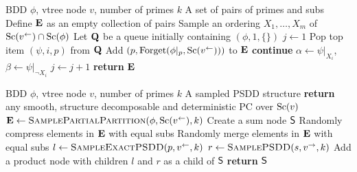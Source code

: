 \begin{algorithm}[t]
  \caption{}\label{alg:samplepartial}
  \begin{algorithmic}[1]
    \Require BDD $\phi$, vtree node $v$, number of primes $k$
    \Ensure A set of pairs of primes and subs
    \State Define $\mathbf{E}$ as an empty collection of pairs
    \State Sample an ordering $X_1,\ldots,X_m$ of $\operatorname*{\normalfont{Sc}}(v^\gets)\cap\operatorname*{\normalfont{Sc}}(\phi)$
    \State Let $\mathbf{Q}$ be a queue initially containing $(\phi,1,\{\})$
    \State $j\gets 1$
    \label{alg:samplepartial:line:while}
      \State Pop top item $(\psi,i,p)$ from $\mathbf{Q}$
        \State Add $(p,\operatorname{\normalfont{Forget}}(\phi|_p,\operatorname*{\normalfont{Sc}}(v^\gets)))$ to $\mathbf{E}$
        \State \textbf{continue}
      \EndIf
      \State $\alpha\gets\psi|_{X_i}$, $\beta\gets\psi|_{\neg X_i}$
      \NIElse
        \State $j\gets j+1$
      \EndNIElse
    \EndWhile
    \State \textbf{return} $\mathbf{E}$
  \end{algorithmic}
\end{algorithm}

\begin{algorithm}[t]
  \caption{}\label{alg:samplepsdd}
  \begin{algorithmic}[1]
    \Require BDD $\phi$, vtree node $v$, number of primes $k$
    \Ensure A sampled PSDD structure
    \ElsIf{$\phi\equiv\top$}
      \State \textbf{return} any smooth, structure decomposable and deterministic PC over $\operatorname*{\normalfont{Sc}}(v)$
      \label{alg:samplepsdd:line:top}
    \EndIf
    \State $\set{E}\gets\Call{SamplePartialPartition}{\phi,\Sc(v^\gets),k}$
    \State Create a sum node $\operatorname{\textup{\textsf{S}}}$
    \State Randomly compress elements in $\mathbf{E}$ with equal subs
    \State Randomly merge elements in $\mathbf{E}$ with equal subs
      \State $l\gets\Call{SampleExactPSDD}{p,v^\gets,k}$
      \State $r\gets\Call{SamplePSDD}{s,v^\to,k}$
      \State Add a product node with children $l$ and $r$ as a child of $\operatorname{\textup{\textsf{S}}}$
    \EndFor
    \State \textbf{return} $\operatorname{\textup{\textsf{S}}}$
  \end{algorithmic}
\end{algorithm}

